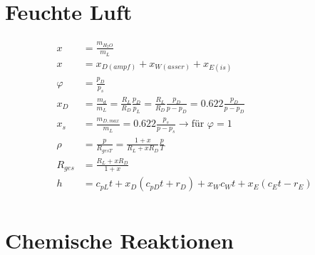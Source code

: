 \documentclass[twocolumn]{article}
\newcommand{\ultraskip}{\bigskip\bigskip\bigskip\bigskip\bigskip\bigskip}
\begin{document}
\begin{multicols}{2}
\ultraskip

%
                                                               
\section{Feuchte Luft}


\begin{align*}
	x &= \frac{m_{H_2O}}{m_L} \\
	x &= x_{D(ampf)} + x_{W(asser)} + x_{E(is)}  \\
	\varphi & = \frac{p_D}{p_s} \\
	x_D &= \frac{m_d}{m_L} = \frac{R_L}{R_D}\frac{p_D}{p_L} = \frac{R_L}{R_D} \frac{p_D}{p-p_D} = 0.622 \frac{p_D}{p-p_D} \\
	x_s &= \frac{m_{D,max}}{m_L} = 0.622 \frac{p_s}{p-p_s} \rightarrow \text{für $\varphi = 1$}\\
	\rho &= \frac{p}{R_{ges T}} = \frac{1 + x}{R_L + xR_D} \frac{p}{T} \\
	R_{ges} &= \frac{R_L + xR_D}{1+x} \\
	h &= c_{pL} t + x_D(c_{pD}t + r_D) + x_W c_W t + x_E (c_E t - r_E) \\
\end{align*}

	\section{Chemische Reaktionen}


\end{multicols}
\end{document}
